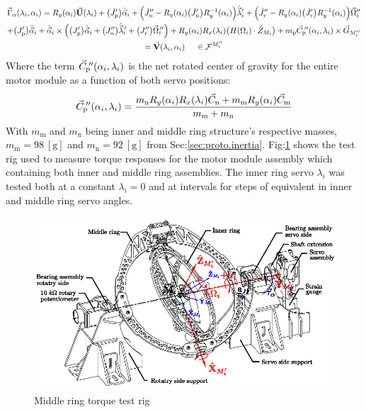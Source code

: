 \begin{multline} \label{eq:model-middle}
\vec{\Gamma}_\alpha(\lambda_i,\alpha_i)=R_y(\alpha_i)\vec{\mathbf{U}}(\lambda_i)+\big(\dot{J}_p'\big)\dot{\vec{\alpha}}_i+\Big(\dot{J}_n''-R_y(\alpha_i)\big(\dot{J}_n'\big)R_y^{-1}(\alpha_i)\Big)\dot{\vec{\lambda}}_i'+\Big(\dot{J}_r''-R_y(\alpha_i)\big(\dot{J}_r'\big)R_y^{-1}(\alpha_i)\Big)\vec{\Omega}_i''
\\
+\big(J_\text{p}'\big)\ddot{\vec{\alpha}}_i+\dot{\vec{\alpha}}_i\times \Big(\big(J_p'\big)\dot{\vec{\alpha}}_i+\big(J_n''\big)\dot{\vec{\lambda}}_i\hspace{-2pt}'+\big(J_r''\big)\vec{\Omega}_i\hspace{-2pt}''\Big)+R_y(\alpha_i)R_x(\lambda_i)\big(H(\Omega_i)\cdot\hat{Z}_{M_i}\big)+m_\text{p}\vec{C}_{\text{p}}\text{}\hspace{-2pt}''(\alpha_i,\lambda_i)\times\vec{G}_{M_i''}
\\
=\vec{\mathbf{V}}(\lambda_i,\alpha_i)~~~~\in\mathcal{F}^{M_i''}
\end{multline}
Where the term $\vec{C}_{\text{p}}\text{}\hspace{-2pt}''(\alpha_i,\lambda_i)$ is the net rotated center of gravity for the entire motor module as a function of both servo positions:
\begin{equation}
\vec{C}_\text{p}\text{}\hspace{-2pt}''(\alpha_i,\lambda_i)=\frac{m_\text{n}R_y(\alpha_i)R_x(\lambda_i)\vec{C}_\text{n}+m_\text{m}R_y(\alpha_i)\vec{C}_\text{m}}{m_\text{m}+m_\text{n}}
\end{equation}
With $m_\text{m}$ and $m_\text{n}$ being inner and middle ring structure's respective masses, $m_\text{m}=98~[\text{g}]$ and $m_\text{n}=92~[\text{g}]$ from Sec:\ref{sec:proto.inertia}.
Fig:\ref{fig:torque-middle} shows the test rig used to measure torque responses for the motor module assembly which containing both inner and middle ring assemblies. The inner ring servo $\lambda_i$ was tested both at a constant $\lambda_i=0$ and at intervals for steps of equivalent in inner and middle ring servo angles.
\par
\begin{figure}[htbp]
\centering
\includegraphics[width=\textwidth]{figs/torque-middle}
\vspace{-10pt}
\caption{Middle ring torque test rig}
\label{fig:torque-middle}
\vspace{-6pt}
\end{figure}
